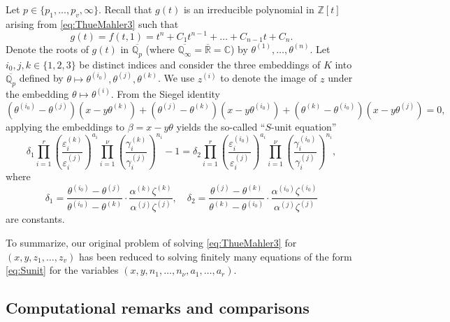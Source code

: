 Let $p \in \{p_1, \dots, p_v, \infty\}$. Recall that $g(t)$ is an irreducible polynomial in $\mathbb{Z}[t]$ arising from \eqref{eq:ThueMahler3} such that
\[g(t) = f(t,1) = t^n + C_1 t^{n-1} + \dots + C_{n-1}t + C_n.\]
Denote the roots of $g(t)$ in $\overline{\mathbb{Q}_p}$ (where $\overline{\mathbb{Q}_{\infty}} = \overline{\mathbb{R}} = \mathbb{C}$) by $\theta^{(1)}, \dots, \theta^{(n)}$. Let $i_0, j, k \in \{1,2,3\}$ be distinct indices and consider the three embeddings of $K$ into $\overline{\mathbb{Q}_p}$ defined by $\theta \mapsto \theta^{(i_0)}, \theta^{(j)}, \theta^{(k)}$. We use $z^{(i)}$ to denote the image of $z$ under the embedding $\theta \mapsto \theta^{(i)}$. From the Siegel identity
\[(\theta^{(i_0)} - \theta^{(j)})(x-y\theta^{(k)}) + (\theta^{(j)} - \theta^{(k)})(x-y\theta^{(i_0)}) + (\theta^{(k)} - \theta^{(i_0)})(x-y\theta^{(j)}) = 0,\]
applying the embeddings to $\beta = x-y\theta$ yields the so-called ``$S$-unit equation''
\begin{equation} \label{eq:Sunit}
\delta_1 \prod_{i = 1}^r\left( \frac{\varepsilon_i^{(k)}}{\varepsilon_i^{(j)}}\right)^{a_i}\prod_{i = 1}^{\nu} \left( \frac{\gamma_i^{(k)}}{\gamma_i^{(j)}}\right)^{n_i} - 1 = \delta_2 \prod_{i = 1}^{r}\left( \frac{\varepsilon_i^{(i_0)}}{\varepsilon_i^{(j)}}\right)^{a_i} \prod_{i = 1}^{\nu} \left( \frac{\gamma_i^{(i_0)}}{\gamma_i^{(j)}}\right)^{n_i},
\end{equation}
where
\[\delta_1 = \frac{\theta^{(i_0)} - \theta^{(j)}}{\theta^{(i_0)} - \theta^{(k)}}\cdot\frac{\alpha^{(k)}\zeta^{(k)}}{\alpha^{(j)}\zeta^{(j)}}, \quad \delta_2 = \frac{\theta^{(j)} - \theta^{(k)}}{\theta^{(k)} - \theta^{(i_0)}}\cdot \frac{\alpha^{(i_0)}\zeta^{(i_0)}}{\alpha^{(j)}\zeta^{(j)}}\]
are constants. 

To summarize, our original problem of solving \eqref{eq:ThueMahler3} for $(x,y,z_1,\dots, z_v)$ has been reduced to solving finitely many equations of the form \eqref{eq:Sunit} for the variables $(x,y, n_1, \dots, n_{\nu},a_1,\dots,a_r)$.


\subsection{Computational remarks and comparisons}
\label{subsec:FactorizationRemarks}

